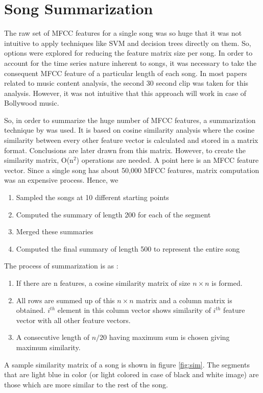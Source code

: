 \section{Song Summarization}
\label{sec:songsumgc}
The raw set of MFCC features for a single song was so huge that it was not intuitive to apply techniques like SVM and decision trees directly on them. So, options were explored for reducing the feature matrix size per song. In order to account for the time series nature inherent to songs, it was necessary to take the consequent MFCC feature of a particular length of each song. In most papers related to music content analysis, the second 30 second clip was taken for this analysis. However, it was not intuitive that this approach will work in case of Bollywood music. \par
So, in order to summarize the huge number of MFCC features, a summarization technique by \cite{cooper} was used. It is based on cosine similarity analysis where the cosine similarity between every other feature vector is calculated and stored in a matrix format. Conclusions are later drawn from this matrix. However, to create the similarity matrix, O(n$^2$) operations are needed. A point here is an MFCC feature vector. Since a single song has about 50,000 MFCC features, matrix computation was an expensive process. Hence, we  
\begin{enumerate} 
\item Sampled the songs at 10 different starting points
\item Computed the summary of length 200 for each of the segment
\item Merged these summaries 
\item Computed the final summary of length 500 to represent the entire song
\end{enumerate}
The process of summarization is as :
\begin{enumerate}
\item If there are n features, a cosine similarity matrix of size $n \times n$ is formed.
\item All rows are summed up of this $n \times n$ matrix and a column matrix is obtained. $i^{th}$ element in this column vector shows similarity of $i^{th}$ feature vector with all other feature vectors.
\item A consecutive length of $n/20$ having maximum sum is chosen giving maximum similarity.
\end{enumerate}
A sample similarity matrix of a song is shown in figure \ref{fig:sim}. The segments that are light blue in color (or light colored in case of black and white image) are those which are more similar to the rest of the song.
